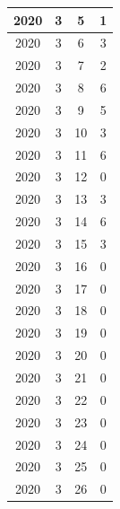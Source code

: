 \begin{longtable} {|c|c|c|c|}
\hline
2020         & 3            & 5            & 1                         \\ 
\hline
2020         & 3            & 6            & 3                         \\ 
\hline
2020         & 3            & 7            & 2                         \\ 
\hline
2020         & 3            & 8            & 6                         \\ 
\hline
2020         & 3            & 9            & 5                         \\ 
\hline
2020         & 3            & 10           & 3                         \\ 
\hline
2020         & 3            & 11           & 6                         \\ 
\hline
2020         & 3            & 12           & 0                         \\ 
\hline
2020         & 3            & 13           & 3                         \\ 
\hline
2020         & 3            & 14           & 6                         \\ 
\hline
2020         & 3            & 15           & 3                         \\ 
\hline
2020         & 3            & 16           & 0                         \\ 
\hline
2020         & 3            & 17           & 0                         \\ 
\hline
2020         & 3            & 18           & 0                         \\ 
\hline
2020         & 3            & 19           & 0                         \\ 
\hline
2020         & 3            & 20           & 0                         \\ 
\hline
2020         & 3            & 21           & 0                         \\ 
\hline
2020         & 3            & 22           & 0                         \\ 
\hline
2020         & 3            & 23           & 0                         \\ 
\hline
2020         & 3            & 24           & 0                         \\ 
\hline
2020         & 3            & 25           & 0                         \\ 
\hline
2020         & 3            & 26           & 0                         \\ 

\end{longtable}
